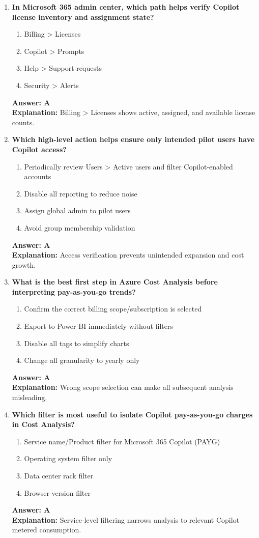 \documentclass[10pt]{article}
\begin{document}
\begin{enumerate}[leftmargin=*]
\item \textbf{In Microsoft 365 admin center, which path helps verify Copilot license inventory and assignment state?}
\begin{enumerate}[label=\Alph*.]
  \item Billing > Licenses
  \item Copilot > Prompts
  \item Help > Support requests
  \item Security > Alerts
\end{enumerate}
\textbf{Answer: A}\\
\textbf{Explanation:} Billing > Licenses shows active, assigned, and available license counts.

\item \textbf{Which high-level action helps ensure only intended pilot users have Copilot access?}
\begin{enumerate}[label=\Alph*.]
  \item Periodically review Users > Active users and filter Copilot-enabled accounts
  \item Disable all reporting to reduce noise
  \item Assign global admin to pilot users
  \item Avoid group membership validation
\end{enumerate}
\textbf{Answer: A}\\
\textbf{Explanation:} Access verification prevents unintended expansion and cost growth.

\item \textbf{What is the best first step in Azure Cost Analysis before interpreting pay-as-you-go trends?}
\begin{enumerate}[label=\Alph*.]
  \item Confirm the correct billing scope/subscription is selected
  \item Export to Power BI immediately without filters
  \item Disable all tags to simplify charts
  \item Change all granularity to yearly only
\end{enumerate}
\textbf{Answer: A}\\
\textbf{Explanation:} Wrong scope selection can make all subsequent analysis misleading.

\item \textbf{Which filter is most useful to isolate Copilot pay-as-you-go charges in Cost Analysis?}
\begin{enumerate}[label=\Alph*.]
  \item Service name/Product filter for Microsoft 365 Copilot (PAYG)
  \item Operating system filter only
  \item Data center rack filter
  \item Browser version filter
\end{enumerate}
\textbf{Answer: A}\\
\textbf{Explanation:} Service-level filtering narrows analysis to relevant Copilot metered consumption.


\end{enumerate}
\end{document}
